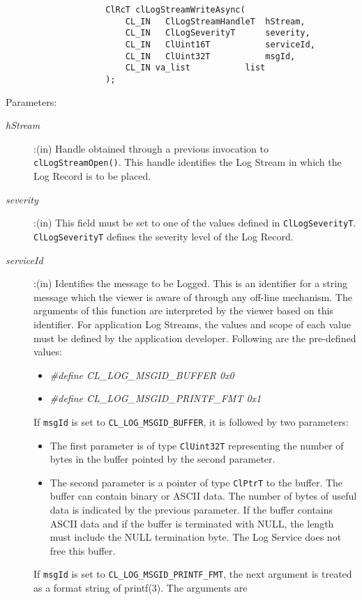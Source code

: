 \begin{flushleft}
\begin{Desc}
\begin{verbatim}
					ClRcT clLogStreamWriteAsync(
						CL_IN	ClLogStreamHandleT	hStream, 
						CL_IN	ClLogSeverityT		severity,
						CL_IN	ClUint16T			serviceId,
						CL_IN	ClUint32T			msgId,
						CL_IN va_list			list
					);
\end{verbatim}
\normalsize
\end{Desc}
\begin{Desc}
\item[Parameters:] \begin{description}
\item[{\em hStream}]:(in) Handle obtained through a previous invocation to {\tt{clLogStreamOpen()}}. This handle identifies the Log Stream in which the
Log Record is to be placed.
\item[{\em severity}]:(in) This field must be set to one of the values defined in {\tt{ClLogSeverityT}}. {\tt{ClLogSeverityT}} defines the severity level
of the Log Record.
\item[{\em serviceId}]:(in) Identifies the message to be Logged. This is an identifier for a string message which the viewer is aware of through any 
off-line mechanism. The arguments of this function are interpreted by the viewer based on this identifier. For application Log Streams, the values and 
scope of each value must be defined by the application developer. Following are the pre-defined values:
\begin{itemize}
\item
\textit{\#define CL\_\-LOG\_\-MSGID\_\-BUFFER		0x0}
\item
\textit{\#define CL\_\-LOG\_\-MSGID\_\-PRINTF\_\-FMT	     0x1}
\end{itemize}
If {\tt{msgId}} is set to {\tt{CL\_\-LOG\_\-MSGID\_\-BUFFER}}, it is followed by two parameters:
\begin{itemize}
\item
The first parameter is of type {\tt{ClUint32T}} representing the number of bytes in the buffer pointed by the second parameter.
\item
The second parameter is a pointer of type {\tt{ClPtrT}} to the buffer. The buffer can contain binary or ASCII data. The number of bytes of useful data is 
indicated by the previous parameter. If the buffer contains ASCII data and if the buffer is terminated with NULL, the length must include the NULL 
termination byte. The Log Service does not free this buffer.
\end{itemize}
If {\tt{msgId}} is set to {\tt{CL\_\-LOG\_\-MSGID\_\-PRINTF\_\-FMT}}, the next argument is treated as a format string of printf(3). The arguments are

\end{description}
\end{Desc}
\end{flushleft}
